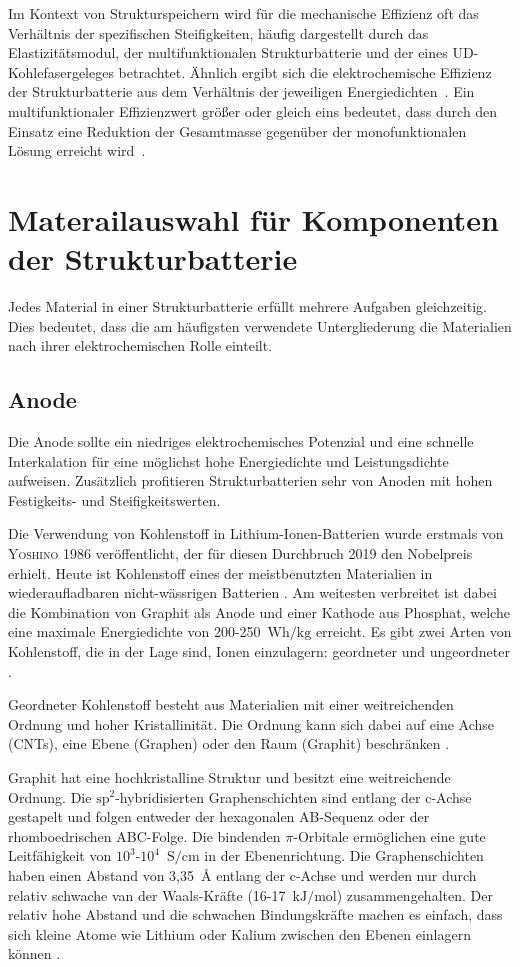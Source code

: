 Im Kontext von Strukturspeichern wird für die mechanische Effizienz oft das Verhältnis der spezifischen Steifigkeiten, häufig dargestellt durch das Elastizitätsmodul, der multifunktionalen Strukturbatterie und der eines UD-Kohlefasergeleges betrachtet. Ähnlich ergibt sich die elektrochemische Effizienz der Strukturbatterie aus dem Verhältnis der jeweiligen Energiedichten~\cite{Sha2021}. Ein multifunktionaler Effizienzwert größer oder gleich eins bedeutet, dass durch den Einsatz eine Reduktion der Gesamtmasse gegenüber der monofunktionalen Lösung erreicht wird~\cite{Snyder2015}.

\section{Materailauswahl für Komponenten der Strukturbatterie}

Jedes Material in einer Strukturbatterie erfüllt mehrere Aufgaben gleichzeitig. Dies bedeutet, dass 
die am häufigsten verwendete Untergliederung die Materialien nach ihrer elektrochemischen Rolle einteilt.


\subsection{Anode}
Die Anode sollte ein niedriges elektrochemisches Potenzial und eine schnelle Interkalation für eine möglichst hohe Energiedichte und Leistungsdichte aufweisen. Zusätzlich profitieren Strukturbatterien sehr von Anoden mit hohen Festigkeits- und Steifigkeitswerten.

Die Verwendung von Kohlenstoff in Lithium-Ionen-Batterien wurde erstmals von \textsc{Yoshino} \cite{Yoshino1986} 1986 veröffentlicht, der für diesen Durchbruch 2019 den Nobelpreis erhielt.
Heute ist Kohlenstoff eines der meistbenutzten Materialien in wiederaufladbaren nicht-wässrigen Batterien \cite{Ahmad2021}. Am weitesten verbreitet ist dabei die Kombination von Graphit als Anode und einer Kathode aus Phosphat, welche eine maximale Energiedichte von 200-250~$\si{\watt \hour \per \kg}$ erreicht. 
Es gibt zwei Arten von Kohlenstoff, die in der Lage sind, Ionen einzulagern: geordneter und ungeordneter \cite{Ghosh2024}.

Geordneter Kohlenstoff besteht aus Materialien mit einer weitreichenden Ordnung und hoher Kristallinität. Die Ordnung kann sich dabei auf eine Achse (CNTs), eine Ebene (Graphen) oder den Raum (Graphit) beschränken \cite{Wang2021}.

Graphit hat eine hochkristalline Struktur und besitzt eine weitreichende Ordnung. Die $\text{sp}^\text{2}$-hybridisierten Graphenschichten sind entlang der c-Achse gestapelt und folgen entweder der hexagonalen AB-Sequenz oder der rhomboedrischen ABC-Folge. Die bindenden $\pi$-Orbitale ermöglichen eine gute Leitfähigkeit von $10^3$-$10^4$~$\si{\siemens \per \cm}$ in der Ebenenrichtung. Die Graphenschichten haben einen Abstand von 3,35~$\si{\angstrom}$ entlang der c-Achse und werden nur durch relativ schwache van der Waals-Kräfte (16-17~$\si{\kJ \per \mol}$) zusammengehalten. Der relativ hohe Abstand und die schwachen Bindungskräfte machen es einfach, dass sich kleine Atome wie Lithium oder Kalium zwischen den Ebenen einlagern können \cite{Wang2021}.

